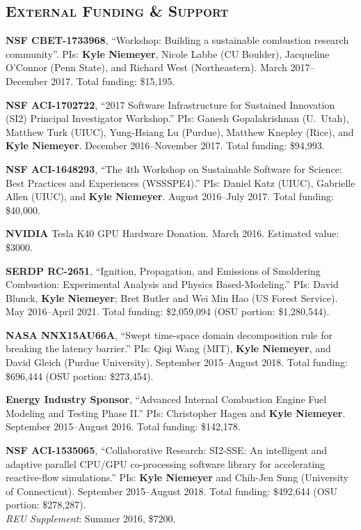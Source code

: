 \documentclass[margin,line,11pt]{res}
\begin{document}
\begin{resume}
\section{\textsc{External Funding \& Support}}

\textbf{NSF CBET-1733968}, ``Workshop: Building a sustainable combustion research community''.
PIs: \textbf{Kyle Niemeyer}, Nicole Labbe (CU Boulder), Jacqueline O'Connor (Penn State), and Richard West (Northeastern).
March 2017--December 2017.
Total funding: \$15,195.

\textbf{NSF ACI-1702722}, ``2017 Software Infrastructure for Sustained Innovation (SI2) Principal Investigator Workshop.''
PIs: Ganesh Gopalakrishnan (U.~Utah), Matthew Turk (UIUC), Yung-Hsiang Lu (Purdue), Matthew Knepley (Rice), and \textbf{Kyle Niemeyer}.
December 2016--November 2017.
Total funding: \$94,993.

\textbf{NSF ACI-1648293}, ``The 4th Workshop on Sustainable Software for Science: Best Practices and Experiences (WSSSPE4).''
PIs: Daniel Katz (UIUC), Gabrielle Allen (UIUC), and \textbf{Kyle Niemeyer}.
August 2016--July 2017.
Total funding: \$40,000.

\textbf{NVIDIA} Tesla K40 GPU Hardware Donation. March 2016. Estimated value: \$3000.

\textbf{SERDP RC-2651}, ``Ignition, Propagation, and Emissions of Smoldering Combustion: Experimental Analysis and Physics Based-Modeling.'' PIs: David Blunck, \textbf{Kyle Niemeyer}; Bret Butler and Wei Min Hao (US Forest Service). May 2016--April 2021. Total funding: \$2,059,094 (OSU portion: \$1,280,544).

\textbf{NASA NNX15AU66A}, ``Swept time-space domain decomposition rule for breaking the latency barrier.'' PIs: Qiqi Wang (MIT), \textbf{Kyle Niemeyer}, and David Gleich (Purdue University). September 2015--August 2018. Total funding: \$696,444 (OSU portion: \$273,454).

\textbf{Energy Industry Sponsor}, ``Advanced Internal Combustion Engine Fuel Modeling and Testing Phase II.'' PIs: Christopher Hagen and \textbf{Kyle Niemeyer}. September 2015--August 2016. Total funding: \$142,178.

\textbf{NSF ACI-1535065}, ``Collaborative Research: SI2-SSE: An intelligent and adaptive parallel CPU\slash GPU co-processing software library for accelerating reactive-flow simulations.'' PIs: \textbf{Kyle Niemeyer} and Chih-Jen Sung (University of Connecticut). September 2015--August 2018. Total funding: \$492,644 (OSU portion: \$278,287). \\
\textit{REU Supplement}: Summer 2016, \$7200.


\end{resume}
\end{document}
